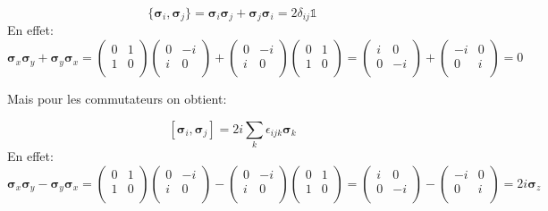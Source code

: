\documentclass[12pt,a4paper]{article}
\newcommand{\unit}
{
\bm{\mathds{1}}
}
\begin{document}
	\[
		\boxed{ \{\bm{\sigma}_i,\bm{\sigma}_j\}=\bm{\sigma}_i\bm{\sigma}_j+\bm{\sigma}_j\bm{\sigma}_i=2 \delta_{ij} \unit}
	\]
	En effet:
	\[
	\bm{\sigma}_x\bm{\sigma}_y+\bm{\sigma}_y\bm{\sigma}_x=\begin{pmatrix}
	0&1\\
	1&0\\
	\end{pmatrix}
	\begin{pmatrix}
	0&-i\\
	i&0\\
	\end{pmatrix}
	+
	\begin{pmatrix}
	0&-i\\
	i&0\\
	\end{pmatrix}
	\begin{pmatrix}
	0&1\\
	1&0\\
	\end{pmatrix}	
	=
	\begin{pmatrix}
	i&0\\
	0&-i\\
	\end{pmatrix}
	+
	\begin{pmatrix}
	-i&0\\
	0&i\\
	\end{pmatrix}
	=0
	\]
	
	Mais pour les commutateurs on obtient:
	
	\[
	\boxed{[\bm{\sigma}_i,\bm{\sigma}_j]=2i \sum_k \epsilon_{ijk}\bm{\sigma}_k}
	\]
	En effet:
	\[
	\bm{\sigma}_x\bm{\sigma}_y-\bm{\sigma}_y\bm{\sigma}_x=\begin{pmatrix}
	0&1\\
	1&0\\
	\end{pmatrix}
	\begin{pmatrix}
	0&-i\\
	i&0\\
	\end{pmatrix}
	-
	\begin{pmatrix}
	0&-i\\
	i&0\\
	\end{pmatrix}
	\begin{pmatrix}
	0&1\\
	1&0\\
	\end{pmatrix}	
	=
	\begin{pmatrix}
	i&0\\
	0&-i\\
	\end{pmatrix}
	-
	\begin{pmatrix}
	-i&0\\
	0&i\\
	\end{pmatrix}
	=2i \bm{\sigma}_z
	\]
	
\end{document}
